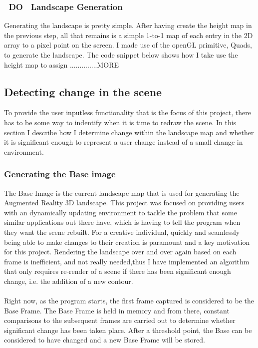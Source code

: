 \documentclass[11pt]{article}
\begin{document}
\subsubsection{~DO~ Landscape Generation}
Generating the landscape is pretty simple. After having create the height map
in the previous step, all that remains is a simple 1-to-1 map of each
entry in the 2D array to a pixel point on the screen. I made use of
the openGL primitive, Quads, to generate the landscape. The code snippet
below shows how I take use the height map to assign ..............MORE


\subsection{Detecting change in the scene}
To provide the user inputless functionality that is the focus of this
project, there has to be some way to indentify when it is time to 
redraw the scene. In this section I describe how I determine change within
the landscape map and whether it is significant enough to represent a 
user change instead of a small change in environment.

\subsubsection{Generating the Base image}
\label{sec:baseimage}
The Base Image is the current landscape map that is used for generating the
Augmented Reality 3D landscape. This project was focused on providing 
users with an dynamically updating environment to tackle the problem that
some similar applications out there have, which is having to tell the program
when they want the scene rebuilt. For a creative individual, quickly and seamlessly
being able to make changes to their creation is paramount and a key motivation
for this project. Rendering the landscape over and over again based on
each frame is inefficient, and not really needed,thus I have implemented an 
algorithm that only requires re-render of a scene if there has been significant
enough change, i.e. the addition of a new contour.\\
\\
Right now, as the program starts, the first frame captured is considered to 
be the Base Frame. The Base Frame is held in memory and from there, 
constant comparisons to the subsequent frames are carried
out to determine whether significant change has been taken place. After a
threshold point, the Base can be considered to have changed and a new Base 
Frame will be stored. 
\end{document}
